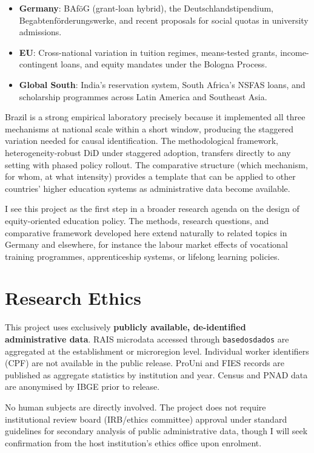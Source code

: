 \documentclass[a4paper,11pt]{article}
\begin{document}
\begin{itemize}[nosep]
    \item \textbf{Germany}: BAf\"oG (grant-loan hybrid), the Deutschlandstipendium, Begabtenf\"orderungswerke, and recent proposals for social quotas in university admissions.
    \item \textbf{EU}: Cross-national variation in tuition regimes, means-tested grants, income-contingent loans, and equity mandates under the Bologna Process.
    \item \textbf{Global South}: India's reservation system, South Africa's NSFAS loans, and scholarship programmes across Latin America and Southeast Asia.
\end{itemize}

Brazil is a strong empirical laboratory precisely because it implemented all three mechanisms at national scale within a short window, producing the staggered variation needed for causal identification. The methodological framework, heterogeneity-robust DiD under staggered adoption, transfers directly to any setting with phased policy rollout. The comparative structure (which mechanism, for whom, at what intensity) provides a template that can be applied to other countries' higher education systems as administrative data become available.

I see this project as the first step in a broader research agenda on the design of equity-oriented education policy. The methods, research questions, and comparative framework developed here extend naturally to related topics in Germany and elsewhere, for instance the labour market effects of vocational training programmes, apprenticeship systems, or lifelong learning policies.

\section{Research Ethics}

This project uses exclusively \textbf{publicly available, de-identified administrative data}. RAIS microdata accessed through \texttt{basedosdados} are aggregated at the establishment or microregion level. Individual worker identifiers (CPF) are not available in the public release. ProUni and FIES records are published as aggregate statistics by institution and year. Census and PNAD data are anonymised by IBGE prior to release.

No human subjects are directly involved. The project does not require institutional review board (IRB/ethics committee) approval under standard guidelines for secondary analysis of public administrative data, though I will seek confirmation from the host institution's ethics office upon enrolment.
\end{document}
